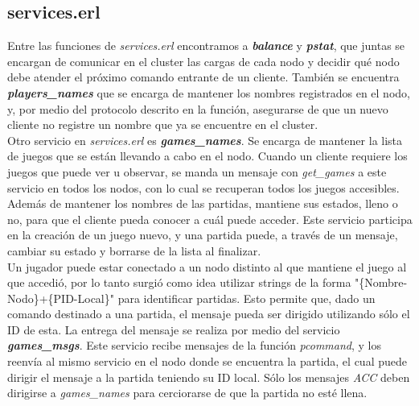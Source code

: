 \documentclass[a4paper]{report}
\newcommand{\femph}[1]{\textbf{\textit{#1}}}
\begin{document}
\subsection*{services.erl}
Entre las funciones de \textit{services.erl} encontramos a \femph{balance} y
\femph{pstat}, que juntas se encargan de comunicar en el cluster las cargas
de cada nodo y decidir qué nodo debe atender el próximo comando entrante de
un cliente. También se encuentra \femph{players\_names} que se encarga de
mantener los nombres registrados en el nodo, y, por medio del protocolo 
descrito en la función, asegurarse de que un nuevo cliente no registre un
nombre que ya se encuentre en el cluster. \\
Otro servicio en \textit{services.erl} es \femph{games\_names}. Se encarga
de mantener la lista de juegos que se están llevando a cabo en el nodo.
Cuando un cliente requiere los juegos que puede ver u observar, se manda un
mensaje con \textit{get\_games} a este servicio en todos los nodos, con lo
cual se recuperan todos los juegos accesibles. Además de mantener los
nombres de las partidas, mantiene sus estados, lleno o no, para que el
cliente pueda conocer a cuál puede acceder. Este servicio participa en la
creación de un juego nuevo, y una partida puede, a través de un mensaje,
cambiar su estado y borrarse de la lista al finalizar. \\
Un jugador puede estar conectado a un nodo distinto al que mantiene el juego
al que accedió, por lo tanto surgió como idea utilizar strings de la forma
"\{Nombre-Nodo\}+\{PID-Local\}" para identificar partidas. Esto permite que, dado
un comando destinado a una partida, el mensaje pueda ser dirigido utilizando
sólo el ID de esta. La entrega del mensaje se realiza por medio del servicio
\femph{games\_msgs}. Este servicio recibe mensajes de la función
\textit{pcommand}, y los reenvía al mismo servicio en el nodo donde se
encuentra la partida, el cual puede dirigir el mensaje a la partida teniendo
su ID local. S\'olo los mensajes \textit{ACC} deben dirigirse a
\textit{games\_names} para cerciorarse de que la partida no est\'e llena.
\end{document}
